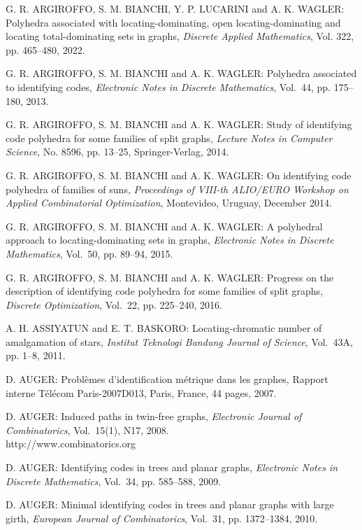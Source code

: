 \begin{thebibliography}{999}
G. R. ARGIROFFO, S. M. BIANCHI, Y. P. LUCARINI and A. K. WAGLER: Polyhedra associated with locating-dominating, open locating-dominating and locating total-dominating sets in graphs, {\it Discrete Applied Mathematics}, Vol. 322, pp. 465--480, 2022.

G. R. ARGIROFFO, S. M. BIANCHI and A. K. WAGLER: Polyhedra associated to identifying codes, {\it Electronic Notes in Discrete Mathematics}, Vol.~44, pp. 175--180, 2013.

G. R. ARGIROFFO, S. M. BIANCHI and A. K. WAGLER: Study of identifying code polyhedra for some families of split graphs, {\it Lecture Notes in Computer Science}, No. 8596, pp. 13--25, Springer-Verlag, 2014.

G. R. ARGIROFFO, S. M. BIANCHI and A. K. WAGLER: On identifying code polyhedra of families of suns, {\it Proceedings of VIII-th ALIO/EURO Workshop on Applied Combinatorial Optimization}, Montevideo, Uruguay, December 2014.

G. R. ARGIROFFO, S. M. BIANCHI and A. K. WAGLER: A polyhedral approach to locating-dominating sets in graphs, {\it Electronic Notes in Discrete Mathematics},  Vol.~50, pp. 89--94, 2015.

G. R. ARGIROFFO, S. M. BIANCHI and A. K. WAGLER: Progress on the description of identifying code polyhedra for some families of split graphs, {\it Discrete Optimization}, Vol.~22, pp. 225--240,  2016.

A. H. ASSIYATUN and E. T. BASKORO: Locating-chromatic number of amalgamation of stars, {\it Institut Teknologi Bandung Journal of Science}, Vol.~43A, pp. 1--8, 2011.

D. AUGER: Probl\`emes d'identification m\'etrique dans les graphes, Rapport interne T\'el\'ecom Paris-2007D013, Paris, France, 44 pages, 2007.

D. AUGER: Induced paths in twin-free graphs, {\it Electronic Journal of Combinatorics}, Vol.~15(1), N17, 2008.\\
http://www.combinatorics.org

D. AUGER: Identifying codes in trees and planar graphs, {\it Electronic Notes in Discrete Mathematics}, Vol.~34, pp. 585--588, 2009.

D. AUGER: Minimal identifying codes in trees and planar graphs with large girth, {\it European Journal of Combinatorics}, Vol.~31, pp. 1372--1384, 2010.


\end{thebibliography}
